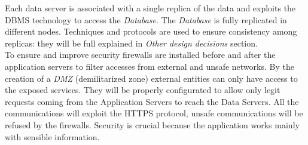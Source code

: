 \documentclass[a4paper]{report}
\begin{document}
Each data server is associated with a single replica of the data and exploits the DBMS technology to access the \textit{Database}. The \textit{Database} is fully replicated in different nodes. Techniques and protocols are used to ensure consistency among replicas: they will be full explained in \textit{Other design decisions} section.\\
To ensure and improve security firewalls are installed before and after the application servers to filter accesses from external and unsafe networks. By the creation of a \textit{DMZ} (demilitarized zone) external entities can only have access to the exposed services. They will be properly configurated to allow only legit requests coming from the Application Servers to reach the Data Servers. All the communications will exploit the HTTPS protocol, unsafe communications will be refused by the firewalls. Security is crucial because the application works mainly with sensible information. 
\end{document}
